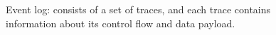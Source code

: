 \begin{figure}[1htbp]
	\begin{center}
		\caption[Event log]{Event log: consists of a set of traces, and each trace contains information about its control flow and data payload.}
		\label{fig:el}
	\end{center}
\end{figure}



